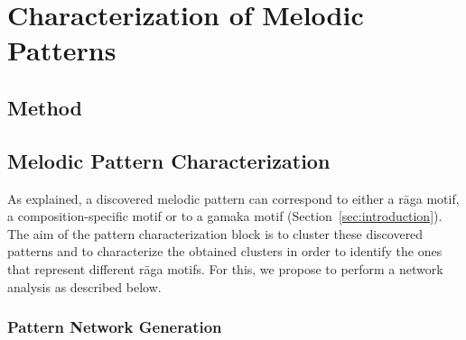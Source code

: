%


\section{Characterization of Melodic Patterns}
\label{sec:patterns_characterization_of_melodic_patterns}


\subsection{Method}

\subsection{Melodic Pattern Characterization}
\label{pattern_characterization}

As explained, a discovered melodic pattern can correspond to either a r\={a}ga motif, a composition-specific motif or to a gamaka motif (Section~\ref{sec:introduction}). The aim of the pattern characterization block is to cluster these discovered patterns and to characterize the obtained clusters in order to identify the ones that represent different r\={a}ga motifs. For this, we propose to perform a network analysis as described below.

\subsubsection{Pattern Network Generation}
\label{sec:network_generation}

